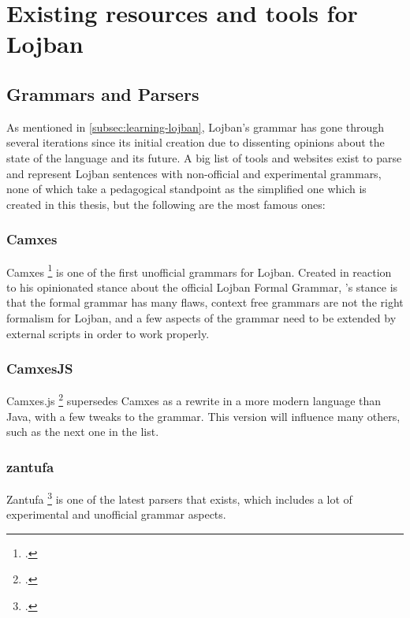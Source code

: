 \chapter{Existing resources and tools for Lojban}
\label{chap:existing-resources-and-tools}

\section{Grammars and Parsers}
\label{section:lojban-grammars}

As mentioned in \ref{subsec:learning-lojban}, Lojban's grammar has gone through several iterations since its initial creation
due to dissenting opinions about the state of the language and its future.
A big list of tools and websites exist to parse and represent Lojban sentences with non-official and experimental grammars,
none of which take a pedagogical standpoint as the simplified one which is created in this thesis, but the following are the most famous ones:

\subsection*{Camxes}

Camxes \footcite{camxes} is one of the first unofficial grammars for Lojban. Created in reaction to his opinionated stance about the official
Lojban Formal Grammar, \citeauthor{camxes}'s stance is that the formal grammar has many flaws, context free grammars are not the right formalism
for Lojban, and a few aspects of the grammar need to be extended by external scripts in order to work properly.

\subsection*{CamxesJS}

Camxes.js \footcite{camxesjs} supersedes Camxes as a rewrite in a more modern language than Java, with a few tweaks to the grammar. This version
will influence many others, such as the next one in the list.

\subsection*{zantufa}

Zantufa \footcite{zantufa} is one of the latest parsers that exists, which includes a lot of experimental and unofficial grammar aspects.

